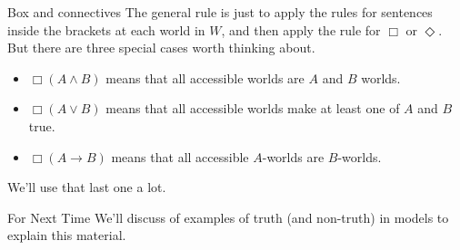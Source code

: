\documentclass[
  ignorenonframetext,
]{beamer}
\providecommand{\tightlist}{%
  \setlength{\itemsep}{0pt}\setlength{\parskip}{0pt}}
\renewcommand{\,}{\text{, }}
\begin{document}
\begin{frame}{Box and connectives}
\protect\hypertarget{box-and-connectives}{}
The general rule is just to apply the rules for sentences inside the
brackets at each world in \(W\), and then apply the rule for \(\Box\) or
\(\Diamond\). But there are three special cases worth thinking about.

\begin{itemize}
\tightlist
\item
  \(\Box(A \wedge B)\) means that all accessible worlds are \(A\) and
  \(B\) worlds. \pause
\item
  \(\Box(A \vee B)\) means that all accessible worlds make at least one
  of \(A\) and \(B\) true.\pause
\item
  \(\Box(A \rightarrow B)\) means that all accessible \(A\)-worlds are
  \(B\)-worlds.
\end{itemize}

We'll use that last one a lot.
\end{frame}

\begin{frame}{For Next Time}
\protect\hypertarget{for-next-time}{}
We'll discuss of examples of truth (and non-truth) in models to explain
this material.
\end{frame}
\end{document}
